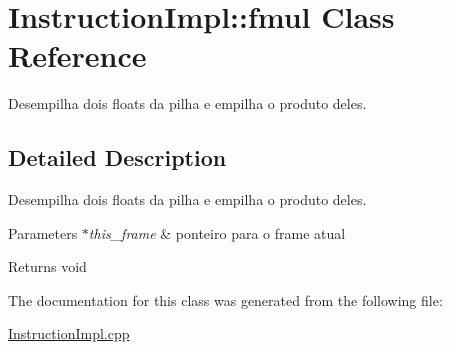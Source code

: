 \hypertarget{class_instruction_impl_1_1fmul}{}\section{Instruction\+Impl\+:\+:fmul Class Reference}
\label{class_instruction_impl_1_1fmul}


Desempilha dois floats da pilha e empilha o produto deles.  




\subsection{Detailed Description}
Desempilha dois floats da pilha e empilha o produto deles. 


\begin{DoxyParams}{Parameters}
{\em $\ast$this\+\_\+frame} & ponteiro para o frame atual \\
\hline
\end{DoxyParams}
\begin{DoxyReturn}{Returns}
void 
\end{DoxyReturn}


The documentation for this class was generated from the following file\+:\begin{DoxyCompactItemize}
\item 
\hyperlink{_instruction_impl_8cpp}{Instruction\+Impl.\+cpp}\end{DoxyCompactItemize}
